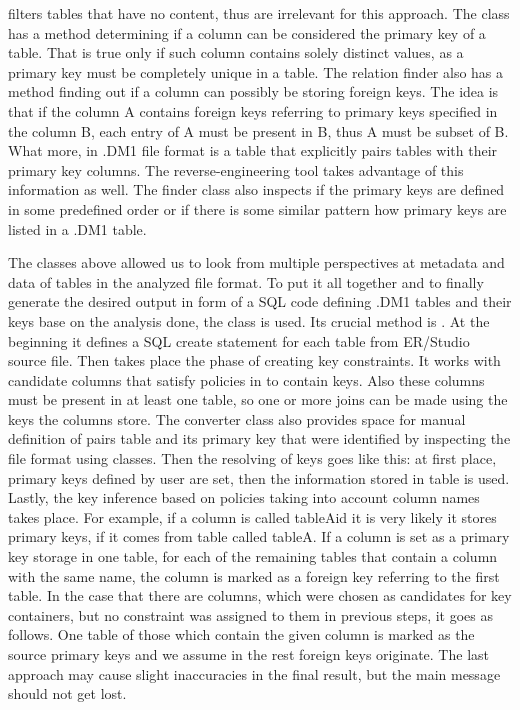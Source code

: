  filters tables that have no content, thus are irrelevant for this approach.
The class has a method determining if a column can be considered the primary key of a table. 
That is true only if such column contains solely distinct values, as a primary key must be completely unique in a table.
The relation finder also has a method finding out if a column can possibly be storing foreign keys. The idea is that if the column A contains foreign keys referring to primary keys specified in the column B, each entry of A must be present in B, thus A must be subset of B.
What more, in .DM1 file format is a table  that explicitly pairs tables with their primary key columns. 
The reverse-engineering tool takes advantage of this information as well.
The finder class also inspects if the primary keys are defined in some predefined order or if there is some similar pattern how primary keys are listed in a .DM1 table.

The classes above allowed us to look from multiple perspectives at metadata and data of tables in the analyzed file format.
To put it all together and to finally generate the desired output in form of a SQL code defining .DM1 tables and their keys base on the analysis done, the class  is used.
Its crucial method is . 
At the beginning it defines a SQL create statement for each table from ER/Studio source file. 
Then takes place the phase of creating key constraints. 
It works with candidate columns that satisfy policies in  to contain keys.
Also these columns must be present in at least one table, so one or more joins can be made using the keys the columns store.
The converter class also provides space for manual definition of pairs table and its primary key that were identified by inspecting the file format using  classes.
Then the resolving of keys goes like this: at first place, primary keys defined by user are set, then the information stored in  table is used. Lastly, the key inference based on policies taking into account column names takes place. 
For example, if a column is called tableA\textunderscore id it is very likely it stores primary keys, if it comes from table called tableA.
If a column is set as a primary key storage in one table, for each of the remaining tables that contain a column with the same name, the column is marked as a foreign key referring to the first table.
In the case that there are columns, which were chosen as candidates for key containers, but no constraint was assigned to them in previous steps, it goes as follows. One table of those which contain the given column is marked as the source primary keys and we assume in the rest foreign keys originate. The last approach may cause slight inaccuracies in the final result, but the main message should not get lost.

